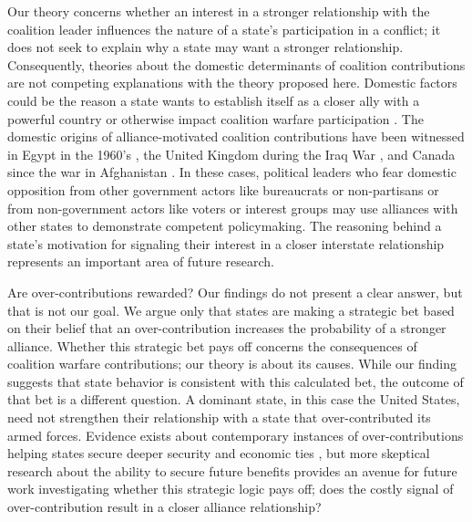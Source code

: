\documentclass[12pt,letterpaper]{article}
\begin{document}
	Our theory concerns whether an interest in a stronger relationship with the coalition leader influences the nature of a state's participation in a conflict; it does not seek to explain why a state may want a stronger relationship. Consequently, theories about the domestic determinants of coalition contributions are not competing explanations with the theory proposed here. Domestic factors could be the reason a state wants to establish itself as a closer ally with a powerful country \citep{tago_whenaredemocratic_2009, pilster_aredemocraciesbetter_2011, wolford_nationalleaderspolitical_2016} or otherwise impact coalition warfare participation \citep{baum_iraqcoalitionwilling_2013}. The domestic origins of alliance-motivated coalition contributions have been witnessed in Egypt in the 1960's \citep{barnett_domesticsourcesalliances_1991}, the United Kingdom during the Iraq War \citep{davidson_americaallieswar_2011}, and Canada since the war in Afghanistan \citep{massie_alliancevaluestatus_2018, mckay_whycanadabest_2018}. In these cases, political leaders who fear domestic opposition from other government actors like bureaucrats or non-partisans or from non-government actors like voters or interest groups may use alliances with other states to demonstrate competent policymaking. The reasoning behind a state's motivation for signaling their interest in a closer interstate relationship represents an important area of future research.

	Are over-contributions rewarded? Our findings do not present a clear answer, but that is not our goal. We argue only that states are making a strategic bet based on their belief that an over-contribution increases the probability of a stronger alliance. Whether this strategic bet pays off concerns the consequences of coalition warfare contributions; our theory is about its causes. While our finding suggests that state behavior is consistent with this calculated bet, the outcome of that bet is a different question. A dominant state, in this case the United States, need not strengthen their relationship with a state that over-contributed its armed forces. Evidence exists about contemporary instances of over-contributions helping states secure deeper security \citep{slavin_buildswarcoalition_2003} and economic ties \citep{whitmore_uswarallies_2003}, but more skeptical research about the ability to secure future benefits \citep{porter_lastchargeknights_2010} provides an avenue for future work investigating whether this strategic logic pays off; does the costly signal of over-contribution result in a closer alliance relationship?
			
\end{document}
